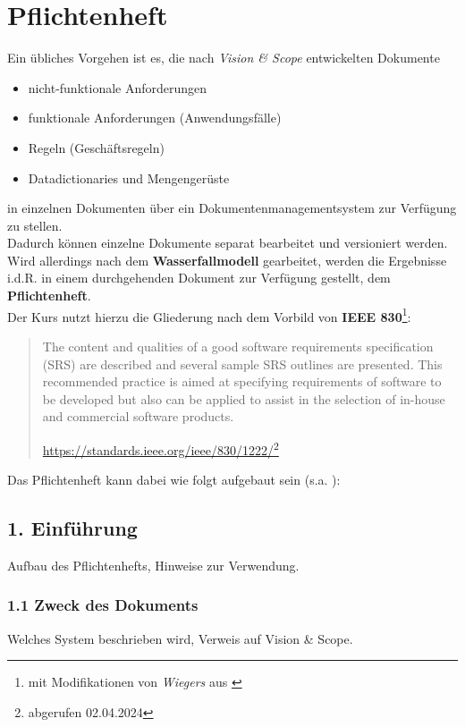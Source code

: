 \section{Pflichtenheft}

\noindent
Ein übliches Vorgehen ist es, die nach \textit{Vision \& Scope} entwickelten Dokumente
\begin{itemize}
    \item nicht-funktionale Anforderungen
    \item funktionale Anforderungen (Anwendungsfälle)
    \item Regeln (Geschäftsregeln)
    \item Datadictionaries und Mengengerüste
\end{itemize}

in einzelnen Dokumenten über ein Dokumentenmanagementsystem zur Verfügung zu stellen.\\
Dadurch können einzelne Dokumente separat bearbeitet und versioniert werden.\\

\noindent
Wird allerdings nach dem \textbf{Wasserfallmodell} gearbeitet, werden die Ergebnisse i.d.R. in einem durchgehenden Dokument zur Verfügung gestellt, dem \textbf{Pflichtenheft}.\\

Der Kurs nutzt hierzu die Gliederung nach dem Vorbild von \textbf{IEEE 830}\footnote{
mit Modifikationen  von \textit{Wiegers} aus \cite[190 ff.]{WJ13}
}:

\blockquote[{\url{https://standards.ieee.org/ieee/830/1222/}\footnote{abgerufen 02.04.2024}}]{
    The content and qualities of a good software requirements specification (SRS) are described and several sample SRS outlines are presented. This recommended practice is aimed at specifying requirements of software to be developed but also can be applied to assist in the selection of in-house and commercial software products.
}

\noindent
Das Pflichtenheft kann dabei wie folgt aufgebaut sein (s.a. \cite[190 ff.]{WJ13}):

\subsection*{1. Einführung}
Aufbau des Pflichtenhefts, Hinweise zur Verwendung.

\subsubsection*{1.1 Zweck des Dokuments}
Welches System beschrieben wird, Verweis auf Vision \& Scope.

